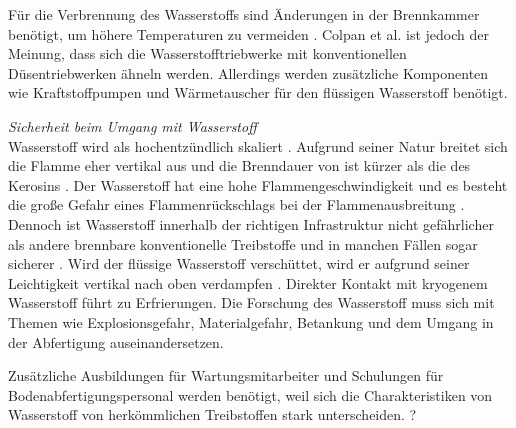 Für die Verbrennung des Wasserstoffs sind Änderungen in der Brennkammer benötigt, um höhere Temperaturen zu vermeiden \cite{khandelwal2013hydrogen}.
Colpan et al. \cite{colpan2022fuel} ist jedoch der Meinung, dass sich die Wasserstofftriebwerke mit konventionellen Düsentriebwerken ähneln werden. 
Allerdings werden zusätzliche Komponenten wie Kraftstoffpumpen und Wärmetauscher für den flüssigen Wasserstoff benötigt.






\textit{Sicherheit beim Umgang mit Wasserstoff}\\
Wasserstoff wird als hochentzündlich skaliert \cite{dalmia2022powering}. Aufgrund seiner Natur breitet sich die Flamme eher 
vertikal aus und die Brenndauer von  ist kürzer als die des Kerosins \cite{colpan2022fuel}.
Der Wasserstoff hat eine hohe Flammengeschwindigkeit und es besteht die große Gefahr eines Flammenrückschlags bei der Flammenausbreitung \cite{khandelwal2013hydrogen}.
Dennoch ist Wasserstoff innerhalb der richtigen Infrastruktur nicht gefährlicher als andere brennbare konventionelle Treibstoffe und in manchen 
Fällen sogar sicherer \cite{khandelwal2013hydrogen}. 
Wird der flüssige Wasserstoff verschüttet, wird er aufgrund seiner Leichtigkeit vertikal nach oben verdampfen \cite{colpan2022fuel}. 
Direkter Kontakt mit kryogenem Wasserstoff führt zu Erfrierungen.
Die Forschung des Wasserstoff muss sich mit Themen wie Explosionsgefahr, Materialgefahr, Betankung und 
dem Umgang in der Abfertigung auseinandersetzen. 


Zusätzliche Ausbildungen für Wartungsmitarbeiter und Schulungen für Bodenabfertigungspersonal
werden benötigt, weil sich die Charakteristiken von Wasserstoff 
von herkömmlichen Treibstoffen stark unterscheiden. \cite{mulder2019outlook}?


